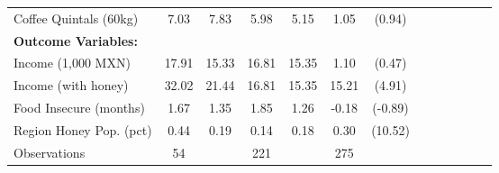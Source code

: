 \begin{table}[htbp]
\begin{tabular}{l*{3}{cccc}}
\addlinespace
Coffee Quintals (60kg)&     7.03&     7.83&     5.98&     5.15&     1.05         &   (0.94)\\
\addlinespace
\textbf{Outcome Variables:}&         &         &         &         &                  &         \\
\addlinespace
Income (1,000 MXN)&    17.91&    15.33&    16.81&    15.35&     1.10         &   (0.47)\\
\addlinespace
Income (with honey)&    32.02&    21.44&    16.81&    15.35&    15.21\sym{***}&   (4.91)\\
\addlinespace
Food Insecure (months)&     1.67&     1.35&     1.85&     1.26&    -0.18         &  (-0.89)\\
\addlinespace
Region Honey Pop. (pct)&     0.44&     0.19&     0.14&     0.18&     0.30\sym{***}&  (10.52)\\
\midrule
Observations    &       54&         &      221&         &      275         &         \\
\bottomrule
\end{tabular}
\end{table}
